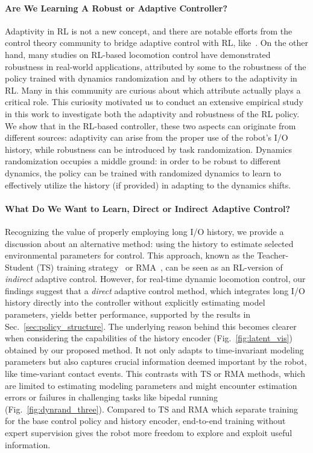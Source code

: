 \paragraph{Are We Learning A Robust or Adaptive Controller?}
Adaptivity in RL is not a new concept, and there are notable efforts from the control theory community to bridge adaptive control with RL, like~\cite{annaswamy2023adaptive}. 
On the other hand, many studies on RL-based locomotion control have demonstrated robustness in real-world applications, attributed by some to the robustness of the policy trained with dynamics randomization and by others to the adaptivity in RL.  
Many in this community are curious about which attribute actually plays a critical role. 
This curiosity motivated us to conduct an extensive empirical study in this work to investigate both the adaptivity and robustness of the RL policy. 
We show that in the RL-based controller, these two aspects can originate from different sources: adaptivity can arise from the proper use of the robot's I/O history, while robustness can be introduced by task randomization. 
Dynamics randomization occupies a middle ground: in order to be robust to different dynamics, the policy can be trained with randomized dynamics to learn to effectively utilize the history (if provided) in adapting to the dynamics shifts. 




\paragraph{What Do We Want to Learn, Direct or Indirect Adaptive Control?}
Recognizing the value of properly employing long I/O history, we provide a discussion about an alternative method: using the history to estimate selected environmental parameters for control. 
This approach, known as the Teacher-Student (TS) training strategy~\citep{lee2020learning} or RMA~\citep{kumar2021rma}, can be seen as an RL-version of \emph{indirect} adaptive control. 
However, for real-time dynamic locomotion control, our findings suggest that a \emph{direct} adaptive control method, which integrates long I/O history directly into the controller without explicitly estimating model parameters, yields better performance, supported by the results in Sec.~\ref{sec:policy_structure}.
The underlying reason behind this becomes clearer when considering the capabilities of the history encoder (Fig.~\ref{fig:latent_vis}) obtained by our proposed method. 
It not only adapts to time-invariant modeling parameters but also captures crucial information deemed important by the robot, like time-variant contact events. 
This contrasts with TS or RMA methods, which are limited to estimating modeling parameters and might encounter estimation errors or failures in challenging tasks like bipedal running (Fig.~\ref{fig:dynrand_three}). 
Compared to TS and RMA which separate training for the base control policy and history encoder, end-to-end training without expert supervision gives the robot more freedom to explore and exploit useful information. 



